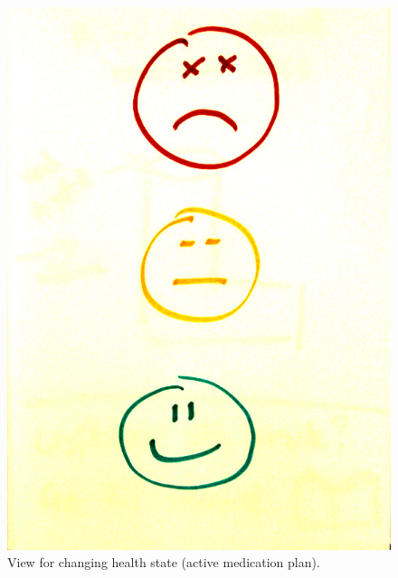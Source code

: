 \begin{figure}
\begin{minipage}[b]{0.46\linewidth}
		\centering
		\includegraphics[width=0.34\paperwidth]{Pictures/DesignWorkshop/HealthStateView}
	\caption[Change health state view from design workshop]{View for changing health state (active medication plan).}
	\label{fig:dwHealthState}
	\end{minipage}
\end{figure}



